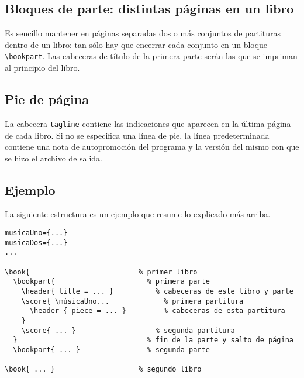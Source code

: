 \subsection{Bloques de parte: distintas páginas en un libro}

Es sencillo mantener en páginas separadas dos o más conjuntos de
partituras dentro de un libro: tan sólo hay que encerrar cada conjunto
en un bloque \verb+\bookpart+.  Las cabeceras de título de la primera
parte serán las que se impriman al principio del libro.

\subsection{Pie de página}

La cabecera \verb+tagline+ contiene las indicaciones que aparecen en
la última página de cada libro.  Si no se especifica una línea de pie,
la línea predeterminada contiene una nota de autopromoción del
programa y la versión del mismo con que se hizo el archivo de salida.

\subsection{Ejemplo}

La siguiente estructura es un ejemplo que resume lo explicado más
arriba.

\begin{verbatim}
musicaUno={...}
musicaDos={...}
...

\book{                          % primer libro
  \bookpart{                      % primera parte
    \header{ title = ... }          % cabeceras de este libro y parte  
    \score{ \músicaUno...             % primera partitura
      \header { piece = ... }         % cabeceras de esta partitura  
    }
    \score{ ... }                   % segunda partitura
  }                               % fin de la parte y salto de página
  \bookpart{ ... }                % segunda parte

\book{ ... }                    % segundo libro
\end{verbatim}
